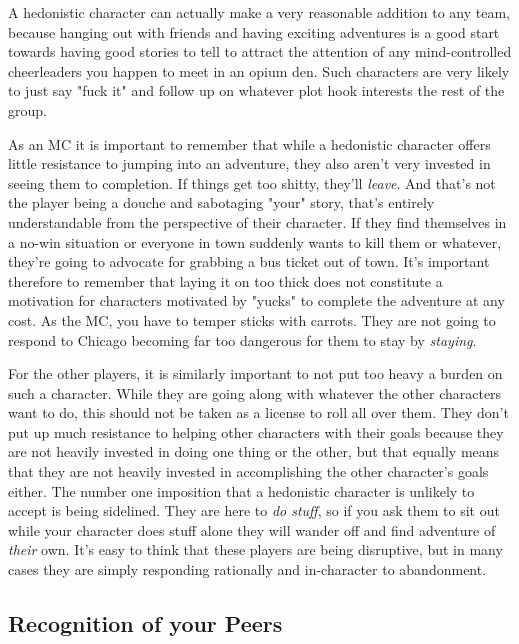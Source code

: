 A hedonistic character can actually make a very reasonable addition to any team, because hanging out with friends and having exciting adventures is a good start towards having good stories to tell to attract the attention of any mind-controlled cheerleaders you happen to meet in an opium den. Such characters are very likely to just say "fuck it" and follow up on whatever plot hook interests the rest of the group.

As an MC it is important to remember that while a hedonistic character offers little resistance to jumping into an adventure, they also aren't very invested in seeing them to completion. If things get too shitty, they'll \textit{leave}. And that's not the player being a douche and sabotaging "your" story, that's entirely understandable from the perspective of their character. If they find themselves in a no-win situation or everyone in town suddenly wants to kill them or whatever, they're going to advocate for grabbing a bus ticket out of town. It's important therefore to remember that laying it on too thick does not constitute a motivation for characters motivated by "yucks" to complete the adventure at any cost. As the MC, you have to temper sticks with carrots. They are not going to respond to Chicago becoming far too dangerous for them to stay by \textit{staying}.

For the other players, it is similarly important to not put too heavy a burden on such a character. While they are going along with whatever the other characters want to do, this should not be taken as a license to roll all over them. They don't put up much resistance to helping other characters with their goals because they are not heavily invested in doing one thing or the other, but that equally means that they are not heavily invested in accomplishing the other character's goals either. The number one imposition that a hedonistic character is unlikely to accept is being sidelined. They are here to \textit{do stuff}, so if you ask them to sit out while your character does stuff alone they will wander off and find adventure of \textit{their} own. It's easy to think that these players are being disruptive, but in many cases they are simply responding rationally and in-character to abandonment.

\subsection{Recognition of your Peers}

